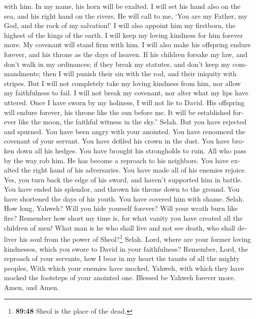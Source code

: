 \begin{paracol}{2}
\begin{otherlanguage}{english}
with him. In my name, his horn will be exalted.  I will
set his hand also on the sea, and his right hand on the rivers.
 He will call to me, `You are my Father, my God, and the
rock of my salvation!'  I will also appoint him my
firstborn, the highest of the kings of the earth.  I will
keep my loving kindness for him forever more. My covenant will stand
firm with him.  I will also make his offspring endure
forever, and his throne as the days of heaven.  If his
children forsake my law, and don't walk in my ordinances;
 if they break my statutes, and don't keep my
commandments;  then I will punish their sin with the rod,
and their iniquity with stripes.  But I will not
completely take my loving kindness from him, nor allow my faithfulness
to fail.  I will not break my covenant, nor alter what my
lips have uttered.  Once I have sworn by my holiness, I
will not lie to David.  His offspring will endure
forever, his throne like the sun before me.  It will be
established forever like the moon, the faithful witness in the sky.''
Selah.  But you have rejected and spurned. You have been
angry with your anointed.  You have renounced the
covenant of your servant. You have defiled his crown in the dust.
 You have broken down all his hedges. You have brought
his strongholds to ruin.  All who pass by the way rob
him. He has become a reproach to his neighbors.  You have
exalted the right hand of his adversaries. You have made all of his
enemies rejoice.  Yes, you turn back the edge of his
sword, and haven't supported him in battle.  You have
ended his splendor, and thrown his throne down to the ground.
 You have shortened the days of his youth. You have
covered him with shame. Selah.  How long, Yahweh? Will
you hide yourself forever? Will your wrath burn like fire?
 Remember how short my time is, for what vanity you have
created all the children of men!  What man is he who
shall live and not see death, who shall deliver his soul from the power
of Sheol?\footnote{\textbf{89:48} Sheol is the place of the dead.}
Selah.  Lord, where are your former loving kindnesses,
which you swore to David in your faithfulness?  Remember,
Lord, the reproach of your servants, how I bear in my heart the taunts
of all the mighty peoples,  With which your enemies have
mocked, Yahweh, with which they have mocked the footsteps of your
anointed one.  Blessed be Yahweh forever more. Amen, and
Amen.


\end{otherlanguage}
\end{paracol}
